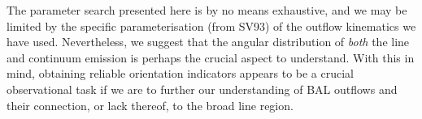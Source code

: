 \documentclass[useAMS,usenatbib]{mn2e_x}
\begin{document}
The parameter search presented here is by no means exhaustive, and
we may be limited by the specific parameterisation (from SV93) of the outflow 
kinematics we have used. Nevertheless, we suggest that the angular distribution
of {\em both} the line and continuum emission is perhaps the crucial 
aspect to understand.
With this in mind, obtaining reliable orientation indicators appears
to be a crucial observational task if we are to
further our understanding of BAL outflows 
and their connection, or lack thereof, to the broad line region. 













\end{document}
